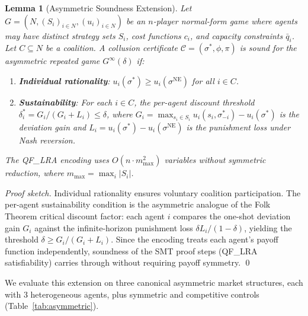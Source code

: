 \documentclass[11pt]{article}
\newtheorem{lemma}[theorem]{Lemma}
\begin{document}
\begin{lemma}[Asymmetric Soundness Extension]
\label{lem:asymsound}
Let $G = (N, (S_i)_{i \in N}, (u_i)_{i \in N})$ be an $n$-player normal-form game where agents may have distinct strategy sets $S_i$, cost functions $c_i$, and capacity constraints $\bar{q}_i$. Let $C \subseteq N$ be a coalition. A collusion certificate $\mathcal{C} = (\sigma^*, \phi, \pi)$ is \emph{sound} for the asymmetric repeated game $G^\infty(\delta)$ if:
\begin{enumerate}[leftmargin=*]
\item \textbf{Individual rationality}: $u_i(\sigma^*) \geq u_i(\sigma^{\mathrm{NE}})$ for all $i \in C$.
\item \textbf{Sustainability}: For each $i \in C$, the per-agent discount threshold $\delta_i^* = G_i / (G_i + L_i) \leq \delta$, where $G_i = \max_{s_i \in S_i} u_i(s_i, \sigma^*_{-i}) - u_i(\sigma^*)$ is the deviation gain and $L_i = u_i(\sigma^*) - u_i(\sigma^{\mathrm{NE}})$ is the punishment loss under Nash reversion.
\end{enumerate}
The QF\_LRA encoding uses $O(n \cdot m_{\max}^2)$ variables without symmetric reduction, where $m_{\max} = \max_i |S_i|$.
\end{lemma}

\noindent\textit{Proof sketch.} Individual rationality ensures voluntary coalition participation. The per-agent sustainability condition is the asymmetric analogue of the Folk Theorem critical discount factor: each agent $i$ compares the one-shot deviation gain $G_i$ against the infinite-horizon punishment loss $\delta L_i / (1 - \delta)$, yielding the threshold $\delta \geq G_i / (G_i + L_i)$. Since the encoding treats each agent's payoff function independently, soundness of the SMT proof steps (QF\_LRA satisfiability) carries through without requiring payoff symmetry. \qed

We evaluate this extension on three canonical asymmetric market structures, each with 3 heterogeneous agents, plus symmetric and competitive controls (Table~\ref{tab:asymmetric}).
\end{document}
